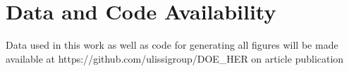 \documentclass[preprint,12pt]{elsarticle}
\begin{document}
\section{Data and Code Availability}
Data used in this work as well as code for generating all figures will be made available at https://github.com/ulissigroup/DOE\_HER on article publication


 


\appendix

\end{document}
